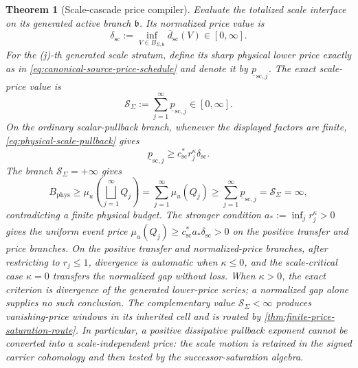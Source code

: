 \documentclass[11pt]{article}
\numberwithin{section}{part}
\theoremstyle{plain}
\newtheorem{theorem}{Theorem}[section]
\theoremstyle{definition}
\theoremstyle{remark}
\newcommand{\Phys}{\mathrm{phys}}
\newcommand{\Budget}{B_{\Phys}}
\begin{document}
\begin{theorem}[Scale-cascade price compiler]
\label{thm:scale-cascade-price-compiler}
Evaluate the totalized scale interface on its generated active branch
\(\mathfrak b\).  Its normalized price value is
\begin{equation}
 \label{eq:scale-normalized-gap}
 \delta_{\mathrm{sc}}
 :=\inf_{V\in B_{\Sigma,\mathfrak b}}\overline d_{\mathrm{sc}}(V)
 \in[0,\infty].
\end{equation}
For the (j)-th generated scale stratum, define its sharp physical lower
price exactly as in \eqref{eq:canonical-source-price-schedule} and denote it
by \(\underline p_{\mathrm{sc},j}\).  The exact scale-price value is
\begin{equation}
 \label{eq:divergent-scale-weight}
 \mathscr S_\Sigma
 :=\sum_{j=1}^{\infty}\underline p_{\mathrm{sc},j}
 \in[0,\infty].
\end{equation}
On the ordinary scalar-pullback branch, whenever the displayed factors are
finite, \eqref{eq:physical-scale-pullback} gives
\begin{equation}
 \label{eq:scale-price-power-lower-bound}
 \underline p_{\mathrm{sc},j}
 \ge c_{\mathrm{sc}}^*r_j^\kappa\delta_{\mathrm{sc}}.
\end{equation}
The branch \(\mathscr S_\Sigma=+\infty\) gives
\begin{equation}
 \label{eq:scale-price-series}
 \Budget
 \ge\mu_u\!\left(\bigsqcup_{j=1}^{\infty}Q_j\right)
 =\sum_{j=1}^{\infty}\mu_u(Q_j)
 \ge\sum_{j=1}^{\infty}\underline p_{\mathrm{sc},j}
 =\mathscr S_\Sigma
 =\infty,
\end{equation}
contradicting a finite physical budget.  The stronger condition
\(a_*:=\inf_jr_j^\kappa>0\) gives the uniform event price
\(\mu_u(Q_j)\ge c_{\mathrm{sc}}^*a_*\delta_{\mathrm{sc}}>0\) on the
positive transfer and price branches.
On the positive transfer and normalized-price branches, after restricting to
\(r_j\le1\), divergence is automatic when \(\kappa\le0\), and the
scale-critical case \(\kappa=0\) transfers the normalized gap without loss.
When \(\kappa>0\), the exact criterion is divergence of the generated
lower-price series; a normalized gap alone supplies no such conclusion.  The
complementary value \(\mathscr S_\Sigma<\infty\)
produces vanishing-price windows in its inherited cell and is routed by
\cref{thm:finite-price-saturation-route}.  In particular, a positive
dissipative pullback exponent cannot be converted into a scale-independent price: the scale
motion is retained in the signed carrier cohomology and then tested by the
successor-saturation algebra.
\end{theorem}
\end{document}
